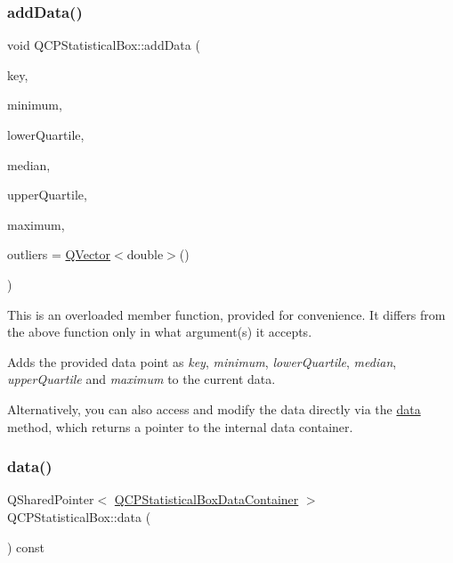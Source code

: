 \subsubsection{\texorpdfstring{add\+Data()}{addData()}\hspace{0.1cm}{\footnotesize\ttfamily [2/2]}}
{\footnotesize\ttfamily void Q\+C\+P\+Statistical\+Box\+::add\+Data (\begin{DoxyParamCaption}\item[{double}]{key,  }\item[{double}]{minimum,  }\item[{double}]{lower\+Quartile,  }\item[{double}]{median,  }\item[{double}]{upper\+Quartile,  }\item[{double}]{maximum,  }\item[{const \hyperlink{class_q_vector}{Q\+Vector}$<$ double $>$ \&}]{outliers = {\ttfamily \hyperlink{class_q_vector}{Q\+Vector}$<$double$>$()} }\end{DoxyParamCaption})}

This is an overloaded member function, provided for convenience. It differs from the above function only in what argument(s) it accepts.

Adds the provided data point as {\itshape key}, {\itshape minimum}, {\itshape lower\+Quartile}, {\itshape median}, {\itshape upper\+Quartile} and {\itshape maximum} to the current data.

Alternatively, you can also access and modify the data directly via the \hyperlink{class_q_c_p_statistical_box_a728e501413eaf191544014173d52dfbc}{data} method, which returns a pointer to the internal data container. \mbox{\label{class_q_c_p_statistical_box_a728e501413eaf191544014173d52dfbc}} 
\subsubsection{\texorpdfstring{data()}{data()}}
{\footnotesize\ttfamily Q\+Shared\+Pointer$<$ \hyperlink{class_q_c_p_data_container}{Q\+C\+P\+Statistical\+Box\+Data\+Container} $>$ Q\+C\+P\+Statistical\+Box\+::data (\begin{DoxyParamCaption}{ }\end{DoxyParamCaption}) const\hspace{0.3cm}{\ttfamily [inline]}}

